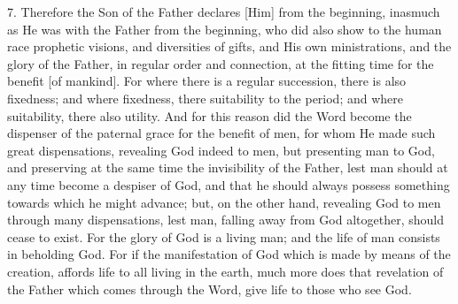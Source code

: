 \documentclass[9pt, twocolumn, oneside, a4paper]{memoir}
\begin{document}
7. Therefore the Son of the Father declares [Him] from the beginning, inasmuch as He was with the Father from the beginning, who did also show to the human race prophetic visions, and diversities of gifts, and His own ministrations, and the glory of the Father, in regular order and connection, at the fitting time for the benefit [of mankind]. For where there is a regular succession, there is also fixedness; and where fixedness, there suitability to the period; and where suitability, there also utility. And for this reason did the Word become the dispenser of the paternal grace for the benefit of men, for whom He made such great dispensations, revealing God indeed to men, but presenting man to God, and preserving at the same time the invisibility of the Father, lest man should at any time become a despiser of God, and that he should  always possess something towards which he might advance; but, on the other hand, revealing God to men through many dispensations, lest man, falling away from God altogether, should cease to exist. For the glory of God is a living man; and the life of man consists in beholding God. For if the manifestation of God which is made by means of the creation, affords life to all living in the earth, much more does that revelation of the Father which comes through the Word, give life to those who see God.
\end{document}
